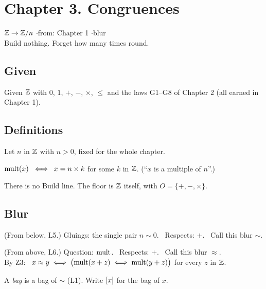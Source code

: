 \section*{Chapter 3. Congruences}
\begin{center}
{\normalsize $\mathbb{Z} \to \mathbb{Z}/n$ \quad$\cdot$\quad from: Chapter 1 \quad$\cdot$\quad blur}\\[4pt]
{\small Build nothing. Forget how many times round.}
\end{center}

\subsection*{Given}

Given $\mathbb{Z}$ with $0$, $1$, $+$, $-$, $\times$, $\le$ and the laws G1--G8 of Chapter 2 (all earned in Chapter 1).

\subsection*{Definitions}

\begin{lines}
\item[\lab{D1}] Let $n$ in $\mathbb{Z}$ with $n > 0$, fixed for the whole chapter.
\item[\lab{D2}] $\operatorname{mult}(x) \;\iff\; x = n \times k$ for some $k$ in $\mathbb{Z}$. \quad (``$x$ is a multiple of $n$''.)
\end{lines}
There is no Build line. The floor is $\mathbb{Z}$ itself, with $O = \{+, -, \times\}$.

\subsection*{Blur}

\begin{lines}
\item[\lab{B1}] (From below, L5.) Gluings: the single pair $n \sim 0$. \ Respects: $+$. \ Call this blur $\sim$.
\item[\lab{B2}] (From above, L6.) Question: $\operatorname{mult}$. \ Respects: $+$. \ Call this blur $\approx$. \\
By Z3: \ $x \approx y \iff \bigl(\operatorname{mult}(x+z) \iff \operatorname{mult}(y+z)\bigr)$ for every $z$ in $\mathbb{Z}$.
\item[] A \emph{bag} is a bag of $\sim$ (L1). Write $[x]$ for the bag of $x$.
\end{lines}


